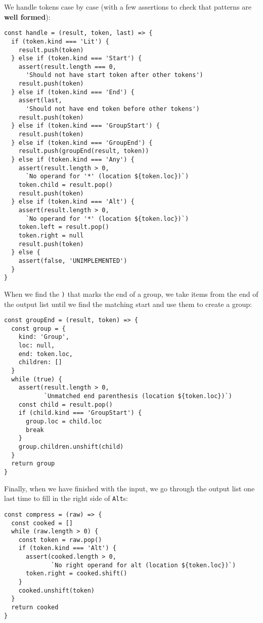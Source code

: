 \documentclass[krantzl]{krantz}
\newcommand{\glossref}[1]{\textbf{#1}}
\begin{document}
We handle tokens case by case
(with a few assertions to check that patterns are \glossref{well formed}):


\begin{lstlisting}[frame=single,frameround=tttt]
const handle = (result, token, last) => {
  if (token.kind === 'Lit') {
    result.push(token)
  } else if (token.kind === 'Start') {
    assert(result.length === 0,
      'Should not have start token after other tokens')
    result.push(token)
  } else if (token.kind === 'End') {
    assert(last,
      'Should not have end token before other tokens')
    result.push(token)
  } else if (token.kind === 'GroupStart') {
    result.push(token)
  } else if (token.kind === 'GroupEnd') {
    result.push(groupEnd(result, token))
  } else if (token.kind === 'Any') {
    assert(result.length > 0,
      `No operand for '*' (location ${token.loc})`)
    token.child = result.pop()
    result.push(token)
  } else if (token.kind === 'Alt') {
    assert(result.length > 0,
      `No operand for '*' (location ${token.loc})`)
    token.left = result.pop()
    token.right = null
    result.push(token)
  } else {
    assert(false, 'UNIMPLEMENTED')
  }
}
\end{lstlisting}



When we find the \texttt{)} that marks the end of a group,
we take items from the end of the output list
until we find the matching start
and use them to create a group:


\begin{lstlisting}[frame=single,frameround=tttt]
const groupEnd = (result, token) => {
  const group = {
    kind: 'Group',
    loc: null,
    end: token.loc,
    children: []
  }
  while (true) {
    assert(result.length > 0,
           `Unmatched end parenthesis (location ${token.loc})`)
    const child = result.pop()
    if (child.kind === 'GroupStart') {
      group.loc = child.loc
      break
    }
    group.children.unshift(child)
  }
  return group
}
\end{lstlisting}



Finally,
when we have finished with the input,
we go through the output list one last time to fill in the right side of \texttt{Alt}s:


\begin{lstlisting}[frame=single,frameround=tttt]
const compress = (raw) => {
  const cooked = []
  while (raw.length > 0) {
    const token = raw.pop()
    if (token.kind === 'Alt') {
      assert(cooked.length > 0,
             `No right operand for alt (location ${token.loc})`)
      token.right = cooked.shift()
    }
    cooked.unshift(token)
  }
  return cooked
}
\end{lstlisting}
\end{document}
